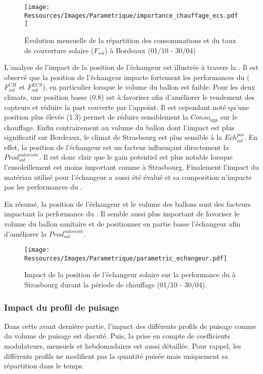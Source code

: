 \begin{figure}
    \centering
    \texttt{[image: Ressources/Images/Parametrique/importance\_chauffage\_ecs.pdf]}
    \caption{Évolution mensuelle de la répartition des consommations et du taux
             de couverture solaire ($F_{sol}$) à Bordeaux (01/10 - 30/04)}
    \label{fig:importance_chauffage_ecs}
\end{figure}

L’analyse de l’impact de la position de l’échangeur est illustrée à travers la
. Il est observé que la position de l’échangeur impacte
fortement les performances du  ($F_{sol}^{CH}$ et $F_{sol}^{ECS}$), en particulier
lorsque le volume du ballon est faible. Pour les deux climats, une position basse
(\num{0.8}) est à favoriser afin d’améliorer le rendement des capteurs et réduire la part
couverte par l’appoint. Il est cependant noté qu’une position plus élevée (\num{1.3})
permet de réduire sensiblement la $Conso_{app}$ sur le chauffage.
Enfin contrairement au volume du ballon dont l’impact est plus significatif sur Bordeaux, le
climat de Strasbourg est plus sensible à la $Ech_{sol}^{pos}$. En effet, la position de l’échangeur
est un facteur influençant directement la $Prod_{sol}^{valorisée}$. Il est donc clair que le gain potentiel
est plus notable lorsque l’ensoleillement est moins important comme à Strasbourg.
Finalement l’impact du matériau utilisé pour l’échangeur a aussi été évalué et sa
composition n’impacte pas les performances du .

En résumé, la position de l’échangeur et le volume des ballons sont des facteurs
impactant la performance du . Il semble aussi plus important de favoriser
le volume du ballon sanitaire et de positionner en partie basse l’échangeur afin
d’améliorer la $Prod_{sol}^{valorisée}$.

\begin{figure}
    \centering
    \texttt{[image: Ressources/Images/Parametrique/parametric\_echangeur.pdf]}
    \caption{Impact de la position de l’échangeur solaire sur la performance
             du  à Strasbourg durant la période de chauffage (01/10 - 30/04).}
    \label{fig:impact_pos_ech}
\end{figure}


\subsubsection{Impact du profil de puisage} %
\label{ssub:impact_du_profil_de_puisage}
Dans cette avant dernière partie, l’impact des différents profils de puisage comme du
volume de puisage est discuté. Puis, la prise en compte de coefficients modulateurs,
mensuels et hebdomadaires est aussi détaillée. Pour rappel, les différents profils ne
modifient pas la quantité puisée mais uniquement sa répartition dans le temps.

